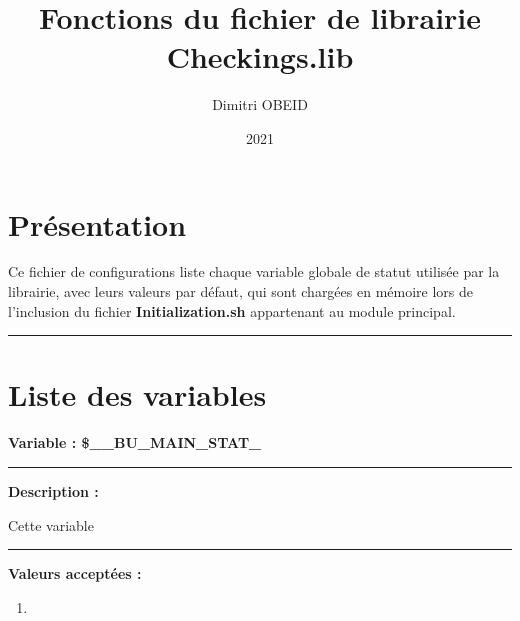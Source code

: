 \documentclass[a4paper,10pt]{article}
\title{\color{sec1}Fonctions du fichier de librairie \color{path}Checkings.lib}\color{text}
\author{Dimitri OBEID}
\date{2021}
\begin{document}
\maketitle
\newpage

\hypertarget{contents}{}
\tableofcontents
\newpage

\color{sec1}
\section{Présentation}\color{text}

\begin{justify}
    Ce fichier de configurations liste chaque variable globale de statut utilisée par la librairie, avec leurs valeurs par défaut, qui sont chargées en mémoire lors de l'inclusion du fichier \textbf{\color{path}Initialization.sh} appartenant au module principal.
\end{justify}





\color{sec1}\par\noindent\rule{\textwidth}{0.4pt}\color{text}

\color{sec1}
\section{Liste des variables}\color{text}

\textbf{Variable : \color{vars}\$\_\_BU\_MAIN\_STAT\_}\\[1\baselineskip]

\par\noindent\rule{\textwidth}{0.4pt}

\begin{justify}
    \textbf{Description :}
\end{justify}

\setlength{\parskip}{1em}

\begin{justify}
    Cette variable
\end{justify}

\par\noindent\rule{\textwidth}{0.4pt}

\textbf{Valeurs acceptées :}
\begin{enumerate}
    \item 
\end{enumerate}
\end{document}
